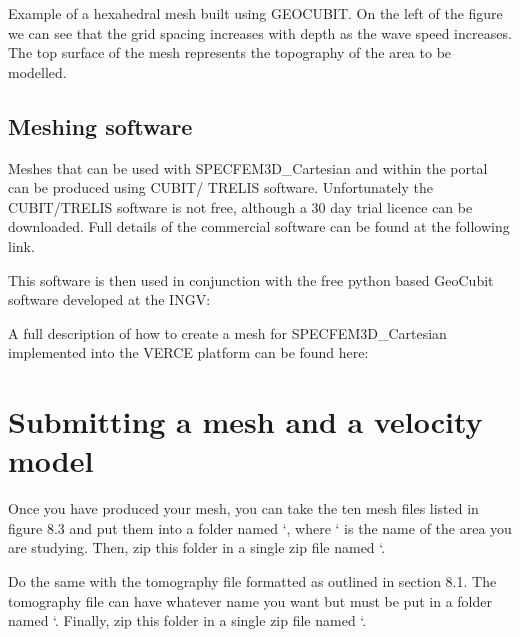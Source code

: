 \documentclass[english]{book}
\begin{document}

 Example of a hexahedral mesh built using GEOCUBIT. On
the left of the figure we can see that the grid spacing increases with
depth as the wave speed increases. The top surface of the mesh
represents the topography of the area to be modelled.


\subsection{Meshing software}
\label{\detokenize{Section8:meshing-software}}
Meshes that can be used with SPECFEM3D\_Cartesian and within the portal
can be produced using CUBIT/ TRELIS software. Unfortunately the
CUBIT/TRELIS software is not free, although a 30 day trial licence can
be downloaded. Full details of the commercial software can be found at
the following link.


This software is then used in conjunction with the free python based
GeoCubit software developed at the INGV:


A full description of how to create a mesh for SPECFEM3D\_Cartesian
implemented into the VERCE platform can be found here:



\section{Submitting a mesh and a velocity model}
\label{\detokenize{Section8:submitting-a-mesh-and-a-velocity-model}}
Once you have produced your mesh, you can take the ten mesh files listed
in figure 8.3 and put them into a folder named
‘, where ‘ is the name
of the area you are studying. Then, zip this folder in a single zip file
named ‘.

Do the same with the tomography file formatted as outlined in section
8.1. The tomography file can have whatever name you want but must be put
in a folder named ‘. Finally, zip this
folder in a single zip file named ‘.
\end{document}
